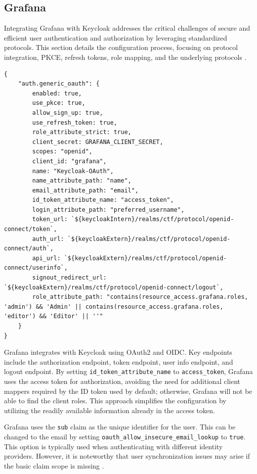 \subsection{Grafana}\label{sec:grafana_auth}
Integrating Grafana with Keycloak addresses the critical challenges of secure and efficient user authentication and authorization by leveraging standardized protocols. This section details the configuration process, focusing on protocol integration, PKCE, refresh tokens, role mapping, and the underlying protocols \parencite{GrafanaKeycloak}.

\begin{verbatim}
{
    "auth.generic_oauth": {
        enabled: true,
        use_pkce: true,
        allow_sign_up: true,
        use_refresh_token: true,
        role_attribute_strict: true,
        client_secret: GRAFANA_CLIENT_SECRET,
        scopes: "openid",
        client_id: "grafana",
        name: "Keycloak-OAuth",
        name_attribute_path: "name",
        email_attribute_path: "email",
        id_token_attribute_name: "access_token",
        login_attribute_path: "preferred_username",
        token_url: `${keycloakIntern}/realms/ctf/protocol/openid-connect/token`,
        auth_url: `${keycloakExtern}/realms/ctf/protocol/openid-connect/auth`,
        api_url: `${keycloakExtern}/realms/ctf/protocol/openid-connect/userinfo`,
        signout_redirect_url: `${keycloakExtern}/realms/ctf/protocol/openid-connect/logout`,
        role_attribute_path: "contains(resource_access.grafana.roles, 'admin') && 'Admin' || contains(resource_access.grafana.roles, 'editor') && 'Editor' || ''"
    }
}
\end{verbatim}

Grafana integrates with Keycloak using OAuth2 and OIDC. Key endpoints include the authorization endpoint, token endpoint, user info endpoint, and logout endpoint. By setting \texttt{id\_token\_attribute\_name} to \texttt{access\_token}, Grafana uses the access token for authorization, avoiding the need for additional client mappers required by the ID token used by default; otherwise, Grafana will not be able to find the client roles. This approach simplifies the configuration by utilizing the readily available information already in the access token.

Grafana uses the \texttt{sub} claim as the unique identifier for the user. This can be changed to the email by setting \texttt{oauth\_allow\_insecure\_email\_lookup} to \texttt{true}. This option is typically used when authenticating with different identity providers. However, it is noteworthy that user synchronization issues may arise if the basic claim scope is missing \parencite{grafana_authentication}.

